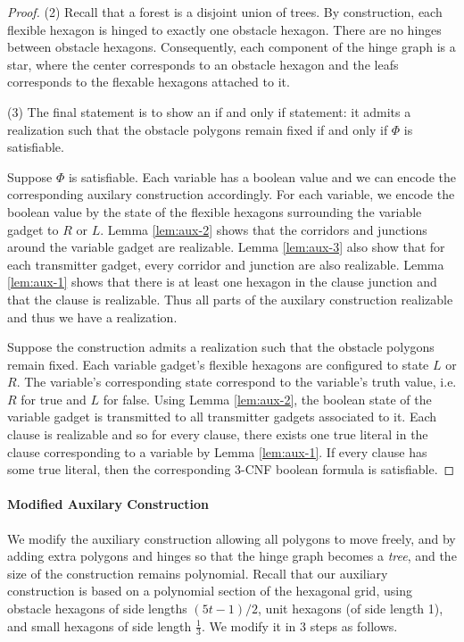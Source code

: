 \begin{proof}
\noindent (2) Recall that a forest is a disjoint union of trees. 
By construction, each flexible hexagon is hinged to exactly one obstacle hexagon.  
There are no hinges between obstacle hexagons.
Consequently, each component of the hinge graph is a star, where the center corresponds to an obstacle hexagon and the leafs corresponds to the flexable hexagons attached to it.

\noindent (3) The final statement is to show an if and only if statement: it admits a realization such that the obstacle polygons remain fixed if and only if $\Phi$ is satisfiable.

Suppose $\Phi$ is satisfiable.  %
Each variable has a boolean value and we can encode the corresponding auxilary construction accordingly.  
For each variable, we encode the boolean value by the state of the flexible hexagons surrounding the variable gadget to $R$ or $L$.  
Lemma \ref{lem:aux-2} shows that the corridors and junctions around the variable gadget are realizable.
Lemma \ref{lem:aux-3} also show that for each transmitter gadget, every corridor and junction are also realizable. 
Lemma \ref{lem:aux-1} shows that there is at least one hexagon in the clause junction and that the clause is realizable.
Thus all parts of the auxilary construction realizable and thus we have a realization.

Suppose the construction admits a realization such that the obstacle polygons remain fixed.
Each variable gadget's flexible hexagons are configured to state $L$ or $R$. 
The variable's corresponding state correspond to the variable's truth value, i.e. $R$ for true and $L$ for false.
Using Lemma \ref{lem:aux-2}, the boolean state of the variable gadget is transmitted to all transmitter gadgets associated to it.
Each clause is realizable and so for every clause, there exists one true literal in the clause corresponding to a variable by Lemma \ref{lem:aux-1}. 
If every clause has some true literal, then the corresponding 3-CNF boolean formula is satisfiable.
\end{proof}
\paragraph{Modified Auxilary Construction}
We modify the auxiliary construction allowing all polygons to move freely, and by adding extra polygons and hinges so that the hinge graph becomes a \emph{tree}, and the size of the construction remains polynomial. 
Recall that our auxiliary construction is based on a polynomial section of the hexagonal grid, using obstacle hexagons of side lengths $(5t-1)/2$, unit hexagons (of side length 1), and small hexagons of side length $\frac{1}{3}$. 
We modify it in 3 steps as follows.

